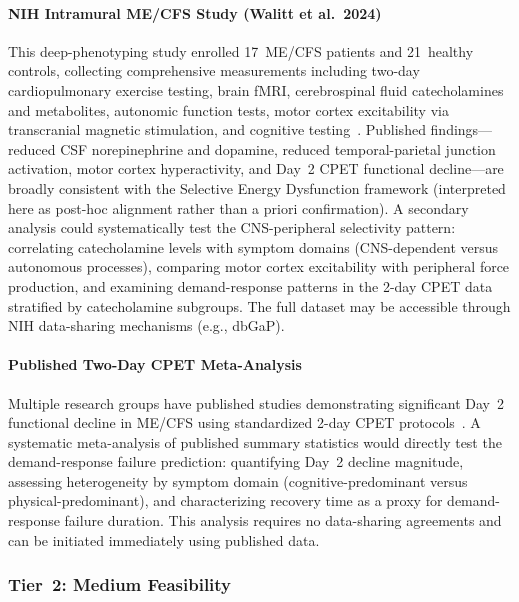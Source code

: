 \paragraph{NIH Intramural ME/CFS Study (Walitt et al.\ 2024)}
This deep-phenotyping study enrolled 17~ME/CFS patients and 21~healthy controls,
collecting comprehensive measurements including two-day cardiopulmonary exercise testing,
brain fMRI, cerebrospinal fluid catecholamines and metabolites, autonomic function tests,
motor cortex excitability via transcranial magnetic stimulation, and cognitive
testing~\cite{walitt2024deep}. Published findings—reduced CSF norepinephrine and
dopamine, reduced temporal-parietal junction activation, motor cortex hyperactivity, and
Day~2 CPET functional decline—are broadly consistent with the Selective Energy
Dysfunction framework (interpreted here as post-hoc alignment rather than a priori
confirmation). A secondary analysis could systematically test the CNS-peripheral
selectivity pattern: correlating catecholamine levels with symptom domains
(CNS-dependent versus autonomous processes), comparing motor cortex excitability with
peripheral force production, and examining demand-response patterns in the 2-day CPET
data stratified by catecholamine subgroups. The full dataset may be accessible through
NIH data-sharing mechanisms (e.g., dbGaP).

\paragraph{Published Two-Day CPET Meta-Analysis}
Multiple research groups have published studies demonstrating significant Day~2
functional decline in ME/CFS using standardized 2-day CPET
protocols~\cite{keller2024cpet, VanCampen2020SeverityCPET}. A systematic
meta-analysis of published summary statistics would directly test the demand-response
failure prediction: quantifying Day~2 decline magnitude, assessing heterogeneity by
symptom domain (cognitive-predominant versus physical-predominant), and characterizing
recovery time as a proxy for demand-response failure duration. This analysis requires
no data-sharing agreements and can be initiated immediately using published data.

\subsubsection{Tier~2: Medium Feasibility}

